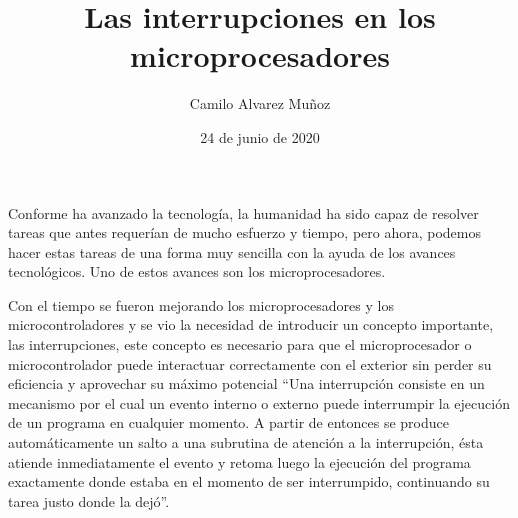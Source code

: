 \documentclass[11pt]{article}
\title{Las interrupciones en los microprocesadores}
\author{Camilo Alvarez Muñoz}
\date{24 de junio de 2020}
\begin{document}
{
\maketitle}
Conforme ha avanzado la tecnología, la humanidad ha sido capaz de resolver tareas que antes requerían de mucho esfuerzo y tiempo, pero ahora, podemos hacer estas tareas de una forma muy sencilla con la ayuda de los avances tecnológicos. Uno de estos avances son los microprocesadores.

Con el tiempo se fueron mejorando los microprocesadores y los microcontroladores y se vio la necesidad de introducir un concepto importante, las interrupciones, este concepto es necesario para que el microprocesador o microcontrolador puede interactuar correctamente con el exterior sin perder su eficiencia y aprovechar su máximo potencial “Una interrupción consiste en un mecanismo por el cual un evento interno o externo puede interrumpir la ejecución de un programa en cualquier momento. A partir de entonces se produce automáticamente un salto a una subrutina de atención a la interrupción, ésta atiende inmediatamente el evento y retoma luego la ejecución del programa exactamente donde estaba en el momento de ser interrumpido, continuando su tarea justo donde la dejó”\cite{apaza2017microcontroladores}.

\medskip
 
\end{document}
